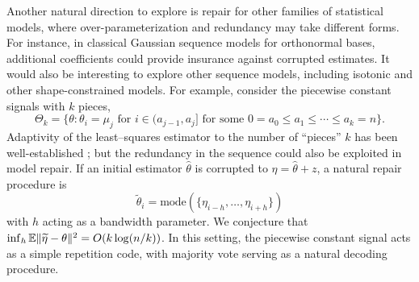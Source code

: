 Another natural direction to explore is repair for other families of statistical models, where over-parameterization and redundancy may take different forms. For instance, in classical Gaussian sequence models for orthonormal bases, additional coefficients could provide insurance against corrupted estimates.
It would also be interesting
to explore other sequence models, including isotonic and other shape-constrained models. For example, consider the piecewise constant signals with $k$ pieces,
$$\Theta_k  = \{\theta : \mbox{$\theta_i = \mu_j$ for $i\in (a_{j-1}, a_j]$ for
some $0=a_0 \leq a_1\leq \cdots \leq a_k=n$}\}.$$
Adaptivity of the least--squares estimator to the number of ``pieces'' $k$  has been well-established
\citep{chatterjee2015risk,Chat14,bellec}; but
the redundancy in the sequence could also be exploited in model repair. If an initial estimator $\hat \theta$ is
corrupted to $\eta = \hat\theta + z$, a natural repair procedure is
$$\tilde \theta_i = \text{mode}(\{\eta_{i-h},\ldots,\eta_{i+h}\})$$
with $h$ acting as a bandwidth parameter. We conjecture that
$\inf_h \mathbb{E}\|\widetilde\eta -\theta\|^2 = O(k \log (n/k))$. In this setting,
the piecewise constant signal acts as a simple repetition code, with majority vote
serving as a natural decoding procedure.


